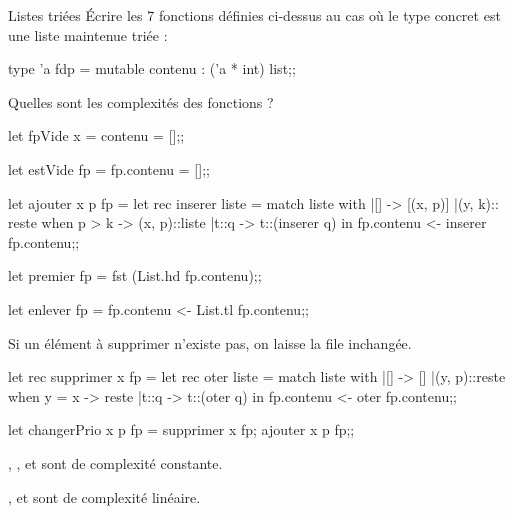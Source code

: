 \begin{exo}{Listes triées}{}
Écrire les 7 fonctions définies ci-dessus au cas où le type concret est une liste maintenue triée :
\begin{ocaml}
type 'a fdp = {mutable contenu : ('a * int) list};;
\end{ocaml}
Quelles sont les complexités des fonctions ?
\reponse
\begin{ocaml}
let fpVide x = 
   {contenu = []};;

let estVide fp =
   fp.contenu = [];;
\end{ocaml}
  
\begin{ocaml}
let ajouter x p fp = 
   let rec inserer liste =
      match liste with
      |[] -> [(x, p)]
      |(y, k):: reste when p > k -> (x, p)::liste
      |t::q -> t::(inserer q) in
   fp.contenu <- inserer fp.contenu;;
\end{ocaml}

\begin{ocaml}
let premier fp =
   fst (List.hd fp.contenu);;
   
let enlever fp =
   fp.contenu <- List.tl fp.contenu;;
\end{ocaml}

Si un élément à supprimer n'existe pas, on laisse la file inchangée.
\begin{ocaml}
let rec supprimer x fp =
   let rec oter liste =
      match liste with
      |[] -> []
      |(y, p)::reste when y = x -> reste
      |t::q -> t::(oter q) in
    fp.contenu <- oter fp.contenu;;

let changerPrio x p fp =
   supprimer x fp;
   ajouter x p fp;;
\end{ocaml}

, ,  et  sont de complexité constante.

,  et  sont de complexité linéaire.
\end{exo}
